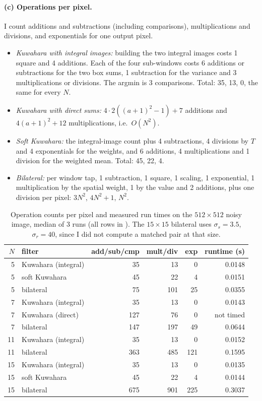 \paragraph{(c) Operations per pixel.} I count additions and subtractions
(including comparisons), multiplications and divisions, and exponentials for one
output pixel.
\begin{itemize}
\item \emph{Kuwahara with integral images:} building the two integral images
costs 1 square and 4 additions. Each of the four sub-windows costs 6 additions or
subtractions for the two box sums, 1 subtraction for the variance and 3
multiplications or divisions. The argmin is 3 comparisons. Total: 35, 13, 0, the
same for every $N$.
\item \emph{Kuwahara with direct sums:} $4\cdot2((a+1)^2-1)+7$ additions and
$4(a+1)^2+12$ multiplications, i.e.\ $O(N^2)$.
\item \emph{Soft Kuwahara:} the integral-image count plus 4 subtractions, 4
divisions by $T$ and 4 exponentials for the weights, and 6 additions, 4
multiplications and 1 division for the weighted mean. Total: 45, 22, 4.
\item \emph{Bilateral:} per window tap, 1 subtraction, 1 square, 1 scaling, 1
exponential, 1 multiplication by the spatial weight, 1 by the value and 2
additions, plus one division per pixel: $3N^2$, $4N^2+1$, $N^2$.
\end{itemize}

\begin{table}[H]
\centering
\begin{tabular}{rlrrrr}
\toprule
$N$ & filter & add/sub/cmp & mult/div & exp & runtime (s)\\
\midrule
5 & Kuwahara (integral) & 35 & 13 & 0 & 0.0148\\
5 & soft Kuwahara & 45 & 22 & 4 & 0.0151\\
5 & bilateral & 75 & 101 & 25 & 0.0355\\
7 & Kuwahara (integral) & 35 & 13 & 0 & 0.0143\\
7 & Kuwahara (direct) & 127 & 76 & 0 & not timed\\
7 & bilateral & 147 & 197 & 49 & 0.0644\\
11 & Kuwahara (integral) & 35 & 13 & 0 & 0.0152\\
11 & bilateral & 363 & 485 & 121 & 0.1595\\
15 & Kuwahara (integral) & 35 & 13 & 0 & 0.0135\\
15 & soft Kuwahara & 45 & 22 & 4 & 0.0144\\
15 & bilateral & 675 & 901 & 225 & 0.3037\\
\bottomrule
\end{tabular}
\caption{Operation counts per pixel and measured run times on the $512\times512$
noisy image, median of 3 runs (all rows in ). The
$15\times15$ bilateral uses $\sigma_s=3.5$, $\sigma_r=40$, since I did not
compute a matched pair at that size.}
\label{tab:complexity}
\end{table}

